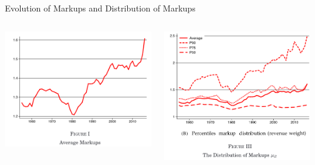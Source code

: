 \documentclass{beamer}
\begin{document}
  \begin{frame}{Evolution of Markups and Distribution of Markups}
    \begin{columns}
\begin{column}{0.5\textwidth}
     \includegraphics[width=\textwidth, keepaspectratio=true]{fig1.png}
\end{column}
\begin{column}{0.5\textwidth}  %
    \begin{center}
     \includegraphics[width=\textwidth, keepaspectratio=true]{fig3.png}
     \end{center}
\end{column}
\end{columns}
  \end{frame}
\end{document}
